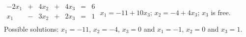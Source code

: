 {$\begin{array}{ccccccc}
-2x_1&+&4x_2&+&4x_3&=&6\\
x_1&-&3x_2&+&2x_3&=&1\\
\end{array}$}
{$x_1=-11+10x_3$; $x_2=-4+4x_3$; $x_3$ is free. Possible solutions: $x_1=-11$, $x_2 = -4$, $x_3=0$ and $x_1 = -1$, $x_2 = 0$ and $x_3 = 1$.}